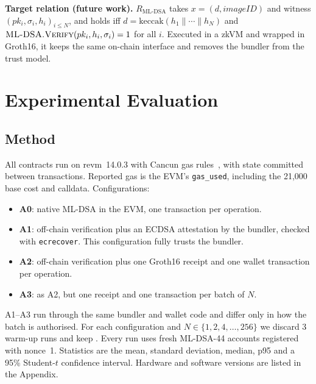 \documentclass[conference]{IEEEtran}
\begin{document}
\textbf{Target relation (future work).} $R_{\mathrm{ML\text{-}DSA}}$ takes $x=(d,\mathit{imageID})$ and witness $(pk_i,\sigma_i,h_i)_{i\le N}$, and holds iff $d=\mathrm{keccak}(h_1\|\cdots\|h_N)$ and $\textsc{ML-DSA.Verify}(pk_i,h_i,\sigma_i)=1$ for all $i$. Executed in a zkVM and wrapped in Groth16, it keeps the same on-chain interface and removes the bundler from the trust model.

\section{Experimental Evaluation}\label{sec:eval}

\subsection{Method}
All contracts run on revm~14.0.3 with Cancun gas rules~\cite{revm}, with state committed between transactions. Reported gas is the EVM's \texttt{gas\_used}, including the 21,000 base cost and calldata. Configurations:
\begin{itemize}
\item \textbf{A0}: native ML-DSA in the EVM, one transaction per operation.
\item \textbf{A1}: off-chain verification plus an ECDSA attestation by the bundler, checked with \texttt{ecrecover}. This configuration fully trusts the bundler.
\item \textbf{A2}: off-chain verification plus one Groth16 receipt and one wallet transaction per operation.
\item \textbf{A3}: as A2, but one receipt and one transaction per batch of $N$.
\end{itemize}
A1--A3 run through the same bundler and wallet code and differ only in how the batch is authorised. For each configuration and $N\in\{1,2,4,\dots,256\}$ we discard 3 warm-up runs and keep \Repeats. Every run uses fresh ML-DSA-44 accounts registered with nonce~1. Statistics are the mean, standard deviation, median, p95 and a 95\% Student-$t$ confidence interval. Hardware and software versions are listed in the Appendix.
\end{document}
